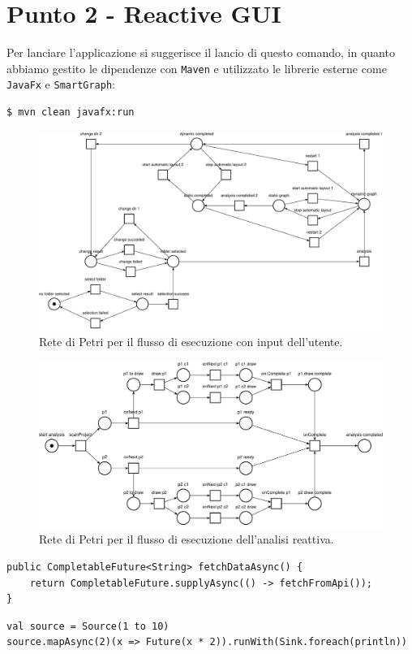 \documentclass[a4paper,12pt]{report}
\begin{document}
    \section{Punto 2 - Reactive GUI}
        Per lanciare l'applicazione si suggerisce il lancio di questo comando, in quanto abbiamo gestito le dipendenze con \texttt{Maven} e utilizzato le librerie esterne come \texttt{JavaFx} e \texttt{SmartGraph}:
    \begin{lstlisting}[style=bash, caption={Avvio dello script}]
        $ mvn clean javafx:run
    \end{lstlisting}

    \begin{figure}[h!]
    \centering
    \includegraphics[width=\textwidth]{petri_nets_pdf/UI.pdf}
    \caption{Rete di Petri per il flusso di esecuzione con input dell'utente.}
    \label{fig:UI}
    \end{figure}

    \begin{figure}[h!]
    \centering
    \includegraphics[width=\textwidth]{petri_nets_pdf/reactive_analysis.pdf}
    \caption{Rete di Petri per il flusso di esecuzione dell'analisi reattiva.}
    \label{fig:reactive_analysis}
    \end{figure}


    \begin{lstlisting}[style=java, caption={Metodo Java asincrono}]
public CompletableFuture<String> fetchDataAsync() {
    return CompletableFuture.supplyAsync(() -> fetchFromApi());
}
    \end{lstlisting}
    \begin{lstlisting}[style=scala, caption={Esempio reattivo in Scala}]
val source = Source(1 to 10)
source.mapAsync(2)(x => Future(x * 2)).runWith(Sink.foreach(println))
    \end{lstlisting}
\end{document}
